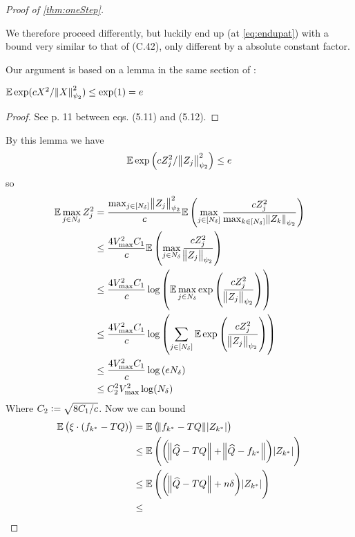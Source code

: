 \begin{proof}[Proof of \cref{thm:oneStep}]
\begin{rem}
    We therefore proceed differently, but luckily end up (at \cref{eq:endupat})
    with a bound very similar to that of  (C.42),
    only different by a absolute constant factor.
    \label{rem:mistake}
  \end{rem}
  Our argument is based on a lemma in the same section of :
  \begin{lem}
    $\mathbb{E} \exp(c X^2 / \norm{X}_{\psi_2}^2) \leq \exp(1) = e$
  \end{lem}
  \begin{proof}
    See  p. 11 between eqs. (5.11) and (5.12).
  \end{proof}
  By this lemma we have
  \begin{equation}
    \mathbb{E} \exp \left(c Z_j^2/\norm{Z_j}_{\psi_2}^2 \right) \leq e
  \end{equation}
  so
  \begin{align}
    \mathbb{E} \max_{j \in N_\delta} Z_j^2
    = &\; \frac{\max_{j \in [N_\delta]} \norm{Z_j}_{\psi_2}^2}{c}
    \mathbb{E} \left( \max_{j \in [N_\delta]} \frac{  c Z_j^2 } 
    {\max_{k \in [N_\delta]} \norm{Z_k}_{\psi_2}} \right)
    \\ \leq &\; \frac{4 V_{\max}^2 C_1}{c}
    \mathbb{E} \left( \max_{j \in N_\delta} \frac{  c Z_j^2 } 
    {\norm{Z_j}_{\psi_2}} \right)
    \\ \leq &\; \frac{4 V_{\max}^2 C_1}{c}
    \log \left( \mathbb{E} \max_{j \in N_\delta} \exp \left( \frac{  c Z_j^2 } 
    {\norm{Z_j}_{\psi_2}} \right) \right)
    \\ \leq &\; \frac{4 V_{\max}^2 C_1}{c}
    \log \left( \sum_{j \in [N_\delta]} \mathbb{E} \exp \left( \frac{  c Z_j^2 } 
    {\norm{Z_j}_{\psi_2}} \right) \right)
    \\ \leq &\; \frac{4 V_{\max}^2 C_1}{c}
    \log \left( e N_\delta \right)
    \\ \leq &\; C_2^2 V_{\max}^2 \log(N_\delta)
    \label{eq:endupat}
  \end{align}
  Where $C_2 \vcentcolon= \sqrt{8 C_1/c}$.
  Now we can bound
  \begin{align}
    \E \left( \xi \cdot (f_{k^*} - TQ) \right)
    &= \E \left( \norm{f_{k^*} - TQ} \abs{Z_{k^*}} \right)
    \label{eq:long1_1}
    \\ &\leq 
    \E \left( \left(\norm{\wh{Q} - TQ} + \norm{\wh{Q} - f_{k^*}} \right)
    \abs{Z_{k^*}} \right) 
    \label{eq:long1_2}
    \\ &\leq 
    \E \left( \left(\norm{\wh{Q} - TQ} + n \delta \right)
    \abs{Z_{k^*}} \right) 
    \label{eq:long1_3}
    \\ &\leq 

\end{align}
\end{proof}
